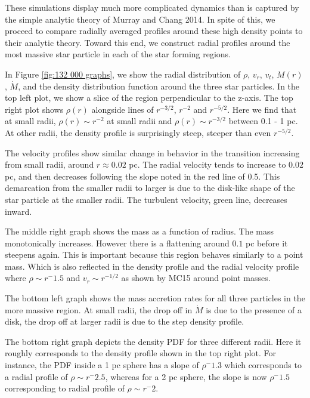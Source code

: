 \documentclass{emulateapj}
\begin{document}
These simulations display much more complicated dynamics than is captured by the simple analytic theory of Murray and Chang 2014.  In spite of this, we proceed to compare radially averaged profiles around these high density points to their analytic theory.  Toward this end, we construct radial profiles around the most massive star particle in each of the star forming regions.

In Figure \ref{fig:132 000 graphs}, we show the radial distribution of $\rho$, $v_r$, $v_t$, $M(r)$, $\dot{M}$, and the density distribution function around the three star particles.  In the top left plot, we show a slice of the region perpendicular to the z-axis.  The top right plot shows $\rho(r)$ alongside lines of $r^{-3/2}$, $r^{-2}$ and $r^{-5/2}$.  Here we find that at small radii, $\rho(r)\sim r^{-2}$ at small radii and $\rho(r) \sim r^{-3/2}$ between 0.1 - 1 pc. At other radii, the density profile is surprisingly steep, steeper than even $r^{-5/2}$.

The velocity profiles show similar change in behavior in the transition increasing from small radii, around $r\approx 0.02$ pc.  The radial velocity tends to increase to $0.02$ pc, and then decreases following the slope noted in the red line of 0.5.  This demarcation from the smaller radii to larger is due to the disk-like shape of the star particle at the smaller radii.  The turbulent velocity, green line, decreases inward.  

The middle right graph shows the mass as a function of radius.  The mass monotonically increases.  However there is a flattening around $0.1$ pc before it steepens again.  This is important because this region behaves similarly to a point mass.  Which is also reflected in the density profile and the radial velocity profile where $\rho \sim r^-1.5$ and $v_r \sim r^{-1/2}$ as shown by MC15 around point masses.  

The bottom left graph shows the mass accretion rates for all three particles in the more massive region.  At small radii, the drop off in $\dot M$ is due to the presence of a disk, the drop off at larger radii is due to the step density profile.  

The bottom right graph depicts the density PDF for three different radii.  Here it roughly corresponds to the density profile shown in the top right plot.  For instance, the PDF inside a 1 pc sphere has a slope of $\rho ^-1.3$ which corresponds to a radial profile of $\rho \sim r^-2.5$, whereas for a 2 pc sphere, the slope is now $\rho ^-1.5$ corresponding to radial profile of $\rho \sim r^-2$.  
\end{document}
